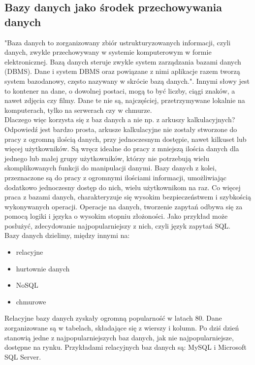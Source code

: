 \documentclass[12pt]{article}
\begin{document}
\begin{sloppypar}
{  \subsection{Bazy danych jako środek przechowywania danych}
  {
    "Baza danych to zorganizowany zbiór ustrukturyzowanych informacji, czyli danych, zwykle przechowywany w systemie komputerowym w formie elektronicznej. 
    Bazą danych steruje zwykle system zarządzania bazami danych (DBMS). 
    Dane i system DBMS oraz powiązane z nimi aplikacje razem tworzą system bazodanowy, często nazywany w skrócie bazą danych.". \cite{oracle-db}
    Innymi słowy jest to kontener na dane, o dowolnej postaci, mogą to być liczby, ciągi znaków, a nawet zdjęcia czy filmy. 
    Dane te nie są, najczęściej, przetrzymywane lokalnie na komputerach, tylko na serwerach czy w chmurze. \\
    Dlaczego więc korzysta się z baz danych a nie np. z arkuszy kalkulacyjnych?\\
    Odpowiedź jest bardzo prosta, arkusze kalkulacyjne nie zostały stworzone do pracy z ogromną ilością danych, przy jednoczesnym dostępie, nawet kilkuset lub więcej użytkowników.
    Są wręcz idealne do pracy z mniejszą ilościa danych dla jednego lub małej grupy użytkowników, którzy nie potrzebują wielu skomplikowanych funkcji do manipulacji danymi.
    Bazy danych z kolei, przeznaczone są do pracy z ogromnymi ilościami informacji, umożliwiając dodatkowo jednoczesny dostęp do nich, wielu użytkownikom na raz. 
    Co więcej praca z bazami danych, charakteryzuje się wysokim bezpieczeństwem i szybkością wykonywanych operacji. Operacje na danych, tworzenie zapytań odbywa się 
    za pomocą logiki i języka o wysokim stopniu złożoności. Jako przykład może posłużyć, zdecydowanie najpopularniejszy z nich, czyli język zapytań SQL.\\
    Bazy danych dzielimy, między innymi na:
    \begin{itemize}
      \item relacyjne
      \item hurtownie danych
      \item NoSQL
      \item chmurowe
    \end{itemize}
    Relacyjne bazy danych zyskały ogromną popularność w latach 80\cite{oracle-db}. Dane zorganizowane są w tabelach, składające się z wierszy i kolumn. Po dziś dzień stanowią 
    jedne z najpopularniejszych baz danych, jak nie najpopularniejsze, dostępne na rynku. Przykładami relacyjnych baz danych są: MySQL i Microsoft SQL Server.\\
}}
\end{sloppypar}
\end{document}
